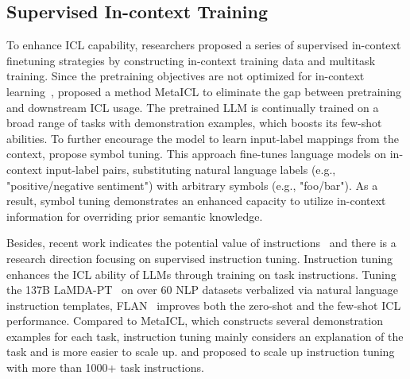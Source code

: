 \subsection{Supervised In-context Training}
\label{sec:s_tuning}
To enhance ICL capability, researchers proposed a series of supervised in-context finetuning strategies by constructing in-context training data and multitask training.
Since the pretraining objectives are not optimized for in-context learning~\citep{selfsupericl}, \citet{metaicl} proposed a method MetaICL to eliminate the gap between pretraining and downstream ICL usage.
The pretrained LLM  is continually trained on a broad range of tasks with demonstration examples, which boosts its few-shot abilities.
To further encourage the model to learn input-label mappings from the context, \citet{symboltuning} propose symbol tuning. This approach fine-tunes language models on in-context input-label pairs, substituting natural language labels (e.g., "positive/negative sentiment") with arbitrary symbols (e.g., "foo/bar"). As a result, symbol tuning demonstrates an enhanced capacity to utilize in-context information for overriding prior semantic knowledge.

Besides, recent work indicates the potential value of instructions~\cite{mishra2021cross} and there is a research direction focusing on supervised instruction tuning. Instruction tuning enhances the ICL ability of LLMs through training on task instructions. %
Tuning the 137B LaMDA-PT~\cite{lamda} on over 60 NLP datasets verbalized via natural language instruction templates, FLAN~\cite{flan} improves both the zero-shot and the few-shot ICL performance.
Compared to MetaICL, which constructs several demonstration examples for each task, instruction tuning mainly considers an explanation of the task and is more easier to scale up. \citet{chung} and \citet{natural} proposed to scale up instruction tuning with more than 1000+ task instructions. %

